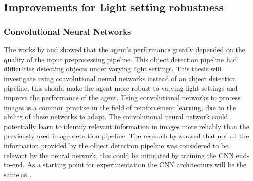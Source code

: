

\subsection{Improvements for Light setting robustness} \label{light_setting_robustness}

\subsubsection{Convolutional Neural Networks}

The works by \autocite{merlin_flach} and \autocite{maximilian} showed that the agent's performance greatly depended on the quality of the input preprocessing pipeline. This object detection pipeline had difficulties detecting objects under varying light settings. This thesis will investigate using convolutional neural networks instead of an object detection pipeline, this should make the agent more robust to varying light settings and improve the performance of the agent.
Using convolutional networks to process images is a common practise in the field of reinforcement learning, due to the ability of these networks to adapt. The convolutional neural network could potentially learn to identify relevant information in images more reliably than the previously used image detection pipeline. The research by \autocite{merlin_flach} showed that not all the information provided by the object detection pipeline was considered to be relevant by the neural network, this could be mitigated by training the CNN end-to-end.
As a starting point for experimentation the CNN architecture will be the same as \autocite{human_level_control}.




